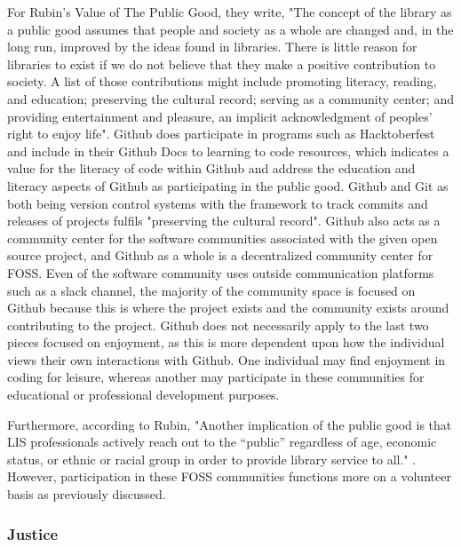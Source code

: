 For Rubin's Value of The Public Good, they write, "The concept of the library as a public good assumes that people and society as a whole are changed and, in the long run, improved by the ideas found in libraries. There is little reason for libraries to exist if we do not believe that they make a positive contribution to society. A list of those contributions might include promoting literacy, reading, and education; preserving the cultural record; serving as a community center; and providing entertainment and pleasure, an implicit acknowledgment of peoples’ right to enjoy life"\cite{rubin2016foundationslis}. Github does participate in programs such as Hacktoberfest and include in their Github Docs to learning to code resources, which indicates a value for the literacy of code within Github and address the education and literacy aspects of Github as participating in the public good. Github and Git as both being version control systems with the framework to track commits and releases of projects fulfils "preserving the cultural record". Github also acts as a community center for the software communities associated with the given open source project, and Github as a whole is a decentralized community center for FOSS. Even of the software community uses outside communication platforms such as a slack channel, the majority of the community space is focused on Github because this is where the project exists and the community exists around contributing to the project. Github does not necessarily apply to the last two pieces focused on enjoyment, as this is more dependent upon how the individual views their own interactions with Github. One individual may find enjoyment in coding for leisure, whereas another may participate in these communities for educational or professional development purposes. 

Furthermore, according to Rubin, "Another implication of the public good is that LIS professionals actively reach out to the “public” regardless of age, economic status, or ethnic or racial group in order to provide library service to all." \cite{rubin2016foundationslis}. However, participation in these FOSS communities functions more on a volunteer basis as previously discussed. 

\subsubsection{Justice}


